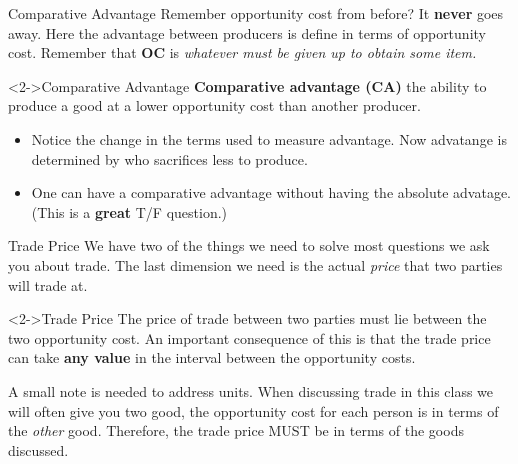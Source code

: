 \documentclass[aspectratio=169]{beamer}
\begin{document}
\begin{frame}{Comparative Advantage}
    Remember opportunity cost from before? It \textbf{never} goes away. Here the advantage between producers is define in terms of opportunity cost. Remember
    that \textbf{OC} is \textit{whatever must be given up to obtain some item.}

    \begin{block}<2->{Comparative Advantage}
        \textbf{Comparative advantage (CA)} the ability to produce a good at a lower opportunity cost than another producer.
    \end{block}

    \begin{itemize}
        \item<3-> Notice the change in the terms used to measure advantage. Now advatange is determined by who sacrifices less to produce.
        \item <4-> One can have a comparative advantage without having the absolute advatage. (This is a \textbf{great} T/F question.)
    \end{itemize}
\end{frame}

\begin{frame}{Trade Price}
    We have two of the things we need to solve most questions we ask you about trade. The last dimension we need is the actual \textit{price} that two parties will trade at.

    \begin{block}<2->{Trade Price}
        The price of trade between two parties must lie between the two opportunity cost. An important consequence of this is that the trade price can take \textbf{any value} in the interval between the opportunity costs. 
    \end{block}
    
    A small note is needed to address units. When discussing trade in this class we will often give you two good, the opportunity cost for each person is in terms of the \textit{other} good. Therefore,
    the trade price MUST be in terms of the goods discussed.
\end{frame}
\end{document}
